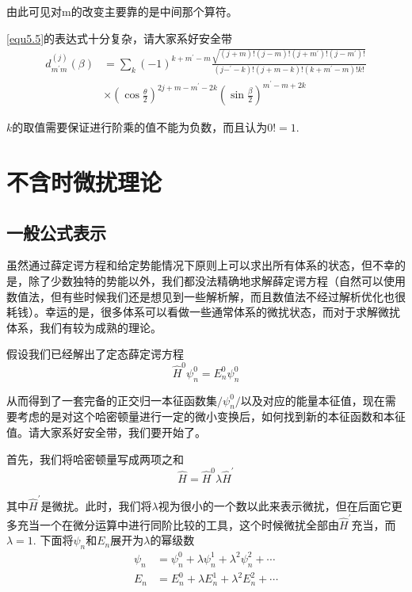 \documentclass[UTF8]{ctexart}
\begin{document}
\noindent 由此可见对m的改变主要靠的是中间那个算符。

    \autoref{equ5.5}的表达式十分复杂，请大家系好安全带
    \begin{equation}
        \begin{aligned}
            d^{(j)}_{m^{\prime}m}(\beta) &= \sum_k (-1)^{k+m^{\prime}-m} \frac{\sqrt{(j+m)!(j-m)!(j+m^{\prime})!(j-m^{\prime})!}}{(j-^{\prime}-k)!(j+m-k)!(k+m^{\prime}-m)!k!} \\
            &\times \left(\cos \frac{\theta}{2}\right)^{2j+m-m^{\prime}-2k}\left(\sin\frac{\beta}{2}\right)^{m^{\prime}-m+2k}
        \end{aligned}
    \end{equation}

\noindent $k$的取值需要保证进行阶乘的值不能为负数，而且认为$0!=1$.

    \section{不含时微扰理论}
    \subsection{一般公式表示}
    虽然通过薛定谔方程和给定势能情况下原则上可以求出所有体系的状态，但不幸的是，除了少数独特的势能以外，我们都没法精确地求解薛定谔方程（自然可以使用数值法，但有些时候我们还是想见到一些解析解，而且数值法不经过解析优化也很耗钱）。幸运的是，很多体系可以看做一些通常体系的微扰状态，而对于求解微扰体系，我们有较为成熟的理论。

    假设我们已经解出了定态薛定谔方程
    \begin{equation}
        \hat{H}^0 \psi_n^0 = E_n^0 \psi_n^0 \label{equ6.1}
    \end{equation}

\noindent 从而得到了一套完备的正交归一本征函数集$/{\psi_n^0/}$以及对应的能量本征值，现在需要考虑的是对这个哈密顿量进行一定的微小变换后，如何找到新的本征函数和本征值。请大家系好安全带，我们要开始了。

    首先，我们将哈密顿量写成两项之和
    \begin{equation}
        \hat{H} = \hat{H}^0 \lambda \hat{H}^{\prime}
    \end{equation}

\noindent 其中$\hat{H}^{\prime}$是微扰。此时，我们将$\lambda$视为很小的一个数以此来表示微扰，但在后面它更多充当一个在微分运算中进行同阶比较的工具，这个时候微扰全部由$\hat{H}^{\prime}$充当，而$\lambda=1$. 下面将$\psi_n$和$E_n$展开为$\lambda$的幂级数 
\begin{equation}
    \begin{aligned}
        \psi_n &= \psi_n^0 + \lambda \psi_n^1 +\lambda^2 \psi_n^2 + \cdots \\
        E_n &= E_n^0 + \lambda E_n^1 + \lambda^2 E_n^2 + \cdots 
    \end{aligned}\label{equ6.2}
\end{equation}
\end{document}
